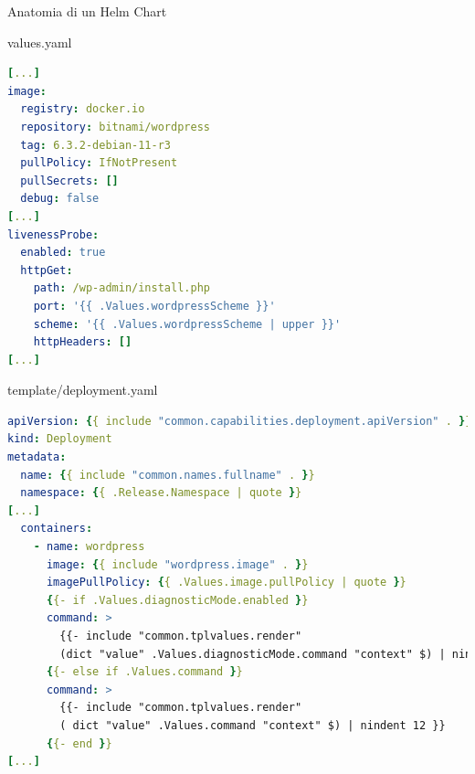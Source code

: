 \documentclass{beamer}
\begin{document}
\begin{frame}{Anatomia di un Helm Chart}
\begin{block}{values.yaml}
\begin{lstlisting}[backgroundcolor=\color{white},language=yaml,basicstyle=\tiny]
[...]
image:
  registry: docker.io
  repository: bitnami/wordpress
  tag: 6.3.2-debian-11-r3
  pullPolicy: IfNotPresent
  pullSecrets: []
  debug: false
[...]
livenessProbe:
  enabled: true
  httpGet:
    path: /wp-admin/install.php
    port: '{{ .Values.wordpressScheme }}'
    scheme: '{{ .Values.wordpressScheme | upper }}'
    httpHeaders: []
[...]
  \end{lstlisting}
  \end{block}
 \framebreak
 \begin{block}{template/deployment.yaml}
 \begin{lstlisting}[backgroundcolor=\color{white},language=yaml,basicstyle=\tiny]
apiVersion: {{ include "common.capabilities.deployment.apiVersion" . }}
kind: Deployment
metadata:
  name: {{ include "common.names.fullname" . }}
  namespace: {{ .Release.Namespace | quote }}
[...]
  containers:
    - name: wordpress
      image: {{ include "wordpress.image" . }}
      imagePullPolicy: {{ .Values.image.pullPolicy | quote }}
      {{- if .Values.diagnosticMode.enabled }}
      command: >
        {{- include "common.tplvalues.render" 
        (dict "value" .Values.diagnosticMode.command "context" $) | nindent 12 }}
      {{- else if .Values.command }}
      command: >
        {{- include "common.tplvalues.render" 
        ( dict "value" .Values.command "context" $) | nindent 12 }}
      {{- end }}
[...]
\end{lstlisting}
\end{block}
\end{frame} 
\end{document}

